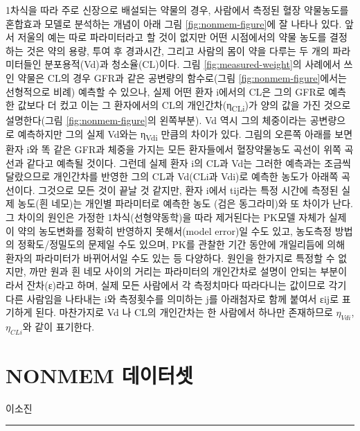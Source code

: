 \documentclass[
  11pt,
  krantz2,
  a4paper]{krantz}
\theoremstyle{definition}
\theoremstyle{definition}
\theoremstyle{definition}
\theoremstyle{remark}
\begin{document}
1차식을 따라 주로 신장으로 배설되는 약물의 경우, 사람에서 측정된 혈장 약물농도를 혼합효과 모델로 분석하는 개념이 아래 그림 \ref{fig:nonmem-figure}에 잘 나타나 있다. 앞서 저울의 예는 따로 파라미터라고 할 것이 없지만 어떤 시점에서의 약물 농도를 결정하는 것은 약의 용량, 투여 후 경과시간, 그리고 사람의 몸이 약을 다루는 두 개의 파라미터들인 분포용적(Vd)과 청소율(CL)이다. 그림 \ref{fig:measured-weight}의 사례에서 쓰인 약물은 CL의 경우 GFR과 같은 공변량의 함수로(그림 \ref{fig:nonmem-figure}에서는 선형적으로 비례) 예측할 수 있으나, 실제 어떤 환자 i에서의 CL은 그의 GFR로 예측한 값보다 더 컸고 이는 그 환자에서의 CL의 개인간차(η\textsubscript{CLi})가 양의 값을 가진 것으로 설명한다(그림 \ref{fig:nonmem-figure}의 왼쪽부분). Vd 역시 그의 체중이라는 공변량으로 예측하지만 그의 실제 Vd와는 η\textsubscript{Vdi} 만큼의 차이가 있다. 그림의 오른쪽 아래를 보면 환자 i와 똑 같은 GFR과 체중을 가지는 모든 환자들에서 혈장약물농도 곡선이 위쪽 곡선과 같다고 예측될 것이다. 그런데 실제 환자 i의 CL과 Vd는 그러한 예측과는 조금씩 달랐으므로 개인간차를 반영한 그의 CL과 Vd(CLi과 Vdi)로 예측한 농도가 아래쪽 곡선이다. 그것으로 모든 것이 끝날 것 같지만, 환자 i에서 tij라는 특정 시간에 측정된 실제 농도(흰 네모)는 개인별 파라미터로 예측한 농도 (검은 동그라미)와 또 차이가 난다. 그 차이의 원인은 가정한 1차식(선형약동학)을 따라 제거된다는 PK모델 자체가 실제 이 약의 농도변화를 정확히 반영하지 못해서(model error)일 수도 있고, 농도측정 방법의 정확도/정밀도의 문제일 수도 있으며, PK를 관찰한 기간 동안에 개일리듬에 의해 환자의 파라미터가 바뀌어서일 수도 있는 등 다양하다. 원인을 한가지로 특정할 수 없지만, 까만 원과 흰 네모 사이의 거리는 파라미터의 개인간차로 설명이 안되는 부분이라서 잔차(ε)라고 하며, 실제 모든 사람에서 각 측정치마다 따라다니는 값이므로 각기 다른 사람임을 나타내는 i와 측정횟수를 의미하는 j를 아래첨자로 함께 붙여서 εij로 표기하게 된다. 마찬가지로 Vd 나 CL의 개인간차는 한 사람에서 하나만 존재하므로 \(\eta_{Vdi}\), \(\eta_{CLi}\)와 같이 표기한다.

\hypertarget{nonmem-dataset}{%
\chapter{NONMEM 데이터셋}\label{nonmem-dataset}}

\Large\hfill

이소진
\normalsize

\begin{center}\rule{0.5\linewidth}{0.5pt}\end{center}
\end{document}
